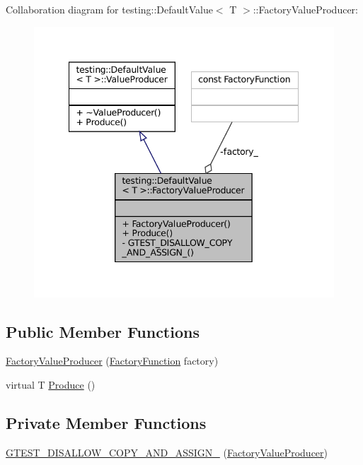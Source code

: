 Collaboration diagram for testing\+:\+:Default\+Value$<$ T $>$\+:\+:Factory\+Value\+Producer\+:
\nopagebreak
\begin{figure}[H]
\begin{center}
\leavevmode
\includegraphics[width=342pt]{classtesting_1_1DefaultValue_1_1FactoryValueProducer__coll__graph}
\end{center}
\end{figure}
\subsection*{Public Member Functions}
\begin{DoxyCompactItemize}
\item 
\hyperlink{classtesting_1_1DefaultValue_1_1FactoryValueProducer_adc9253b20288be937687b3cefa7ef476}{Factory\+Value\+Producer} (\hyperlink{classtesting_1_1DefaultValue_a5763a68d75e0a4c97fcaff708e2df803}{Factory\+Function} factory)
\item 
virtual T \hyperlink{classtesting_1_1DefaultValue_1_1FactoryValueProducer_a246a02412c099b293d905a9749c0fab3}{Produce} ()
\end{DoxyCompactItemize}
\subsection*{Private Member Functions}
\begin{DoxyCompactItemize}
\item 
\hyperlink{classtesting_1_1DefaultValue_1_1FactoryValueProducer_a19e5afa4fea1707fe4fa8a50325a4cf9}{G\+T\+E\+S\+T\+\_\+\+D\+I\+S\+A\+L\+L\+O\+W\+\_\+\+C\+O\+P\+Y\+\_\+\+A\+N\+D\+\_\+\+A\+S\+S\+I\+G\+N\+\_\+} (\hyperlink{classtesting_1_1DefaultValue_1_1FactoryValueProducer}{Factory\+Value\+Producer})
\end{DoxyCompactItemize}
